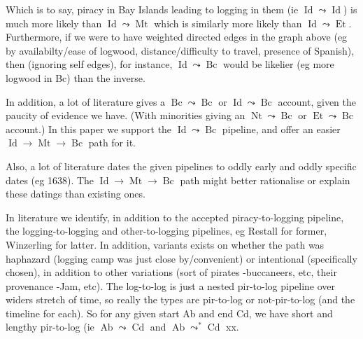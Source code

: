 \documentclass{amsart}
\DeclareMathOperator{\id}{Id}%
\DeclareMathOperator{\mt}{Mt}%
\DeclareMathOperator{\bc}{Bc}%
\DeclareMathOperator{\et}{Et}%
\DeclareMathOperator{\nt}{Nt}%
\DeclareMathOperator{\ab}{Ab}%
\DeclareMathOperator{\cd}{Cd}%
\theoremstyle{definition}%
\theoremstyle{definition}%
\theoremstyle{remark}%
\begin{document}
Which is to say, piracy in Bay Islands leading to logging in them (ie \(\id\leadsto\id\)) is much more likely than \(\id\leadsto\mt\) which is similarly more likely than 
\(\id\leadsto\et\). Furthermore, if we were to have weighted directed edges in the graph above (eg by availabilty/ease of logwood, distance/difficulty to travel, presence of Spanish), then (ignoring self edges), for instance, \(\id\leadsto\bc\) would be likelier (eg more logwood in Bc) than the inverse.

In addition, a lot of literature gives a \(\bc\leadsto\bc\) or \(\id\leadsto\bc\) account, given the paucity of evidence we have. (With minorities giving an \(\nt\leadsto\bc\) or \(\et\leadsto\bc\) account.) In this paper we support the \(\id\leadsto\bc\) pipeline, and offer an easier \(\id\to\mt\to\bc\) path for it.

Also, a lot of literature dates the given pipelines to oddly early and oddly specific dates (eg 1638). The \(\id\to\mt\to\bc\) path might better rationalise or explain these datings than existing ones.

In literature we identify, in addition to the accepted piracy-to-logging pipeline, the logging-to-logging and other-to-logging pipelines, eg Restall for former, Winzerling for latter. In addition, variants exists on whether the path was haphazard (logging camp was just close by/convenient) or intentional (specifically chosen), in addition to other variations (sort of pirates -buccaneers, etc, their provenance -Jam, etc). The log-to-log is just a nested pir-to-log pipeline over widers stretch of time, so really the types are pir-to-log or not-pir-to-log (and the timeline for each). So for any given start Ab and end Cd, we have short and lengthy pir-to-log (ie \(\ab\leadsto\cd\) and \(\ab\leadsto^{*}\cd\) xx.
%
%
%
%
\end{document}
